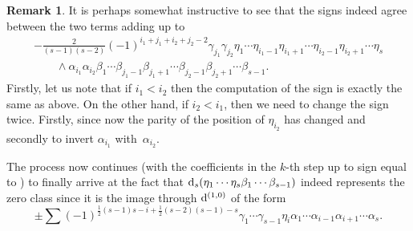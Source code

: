 \documentclass[pdftex]{sigma}
\numberwithin{equation}{section}
\theoremstyle{definition}
\newtheorem{rem}[tw]{Remark}
\begin{document}
\begin{rem} It is perhaps somewhat instructive to see that the signs indeed agree between the two terms adding up to
\begin{gather*}
-\frac{2}{(s-1)(s-2)} (-1)^{i_1+j_1+i_2+j_2-2}\gamma_{j_1}\gamma_{j_2}\eta_1\cdots \eta_{i_1-1}\eta_{i_1+1}\cdots \eta_{i_2-1}\eta_{i_2+1}\cdots\eta_s \\
\qquad{}\wedge
\alpha_{i_1}\alpha_{i_2}\beta_1\cdots \beta_{j_1-1}\beta_{j_1+1}\cdots \beta_{j_2-1}\beta_{j_2+1}\cdots \beta_{s-1}.
\end{gather*}
Firstly, let us note that if $i_1<i_2$ then the computation of the sign is exactly the same as above. On the other hand, if $i_2<i_1$, then we need to change the sign twice. Firstly, since now the parity of the position of $\eta_{i_2}$ has changed and secondly to invert $\alpha_{i_1}$ with~$\alpha_{i_2}$.
\end{rem}
The process now continues (with the coefficients in the $k$-th step up to sign equal to ) to finally arrive at the fact that ${\rm d}_s(\eta_1\cdots \eta_s\beta_1\cdots \beta_{s-1})$ indeed represents the zero class since it is the image through ${\rm d}^{(1,0)}$ of the form
\[\pm\sum (-1)^{\frac{1}{2}(s-1)s-i+\frac{1}{2}(s-2)(s-1)-s}\gamma_1\cdots \gamma_{s-1}\eta_i\alpha_{1}\cdots \alpha_{i-1}\alpha_{i+1}\cdots \alpha_s.\]
\end{document}

